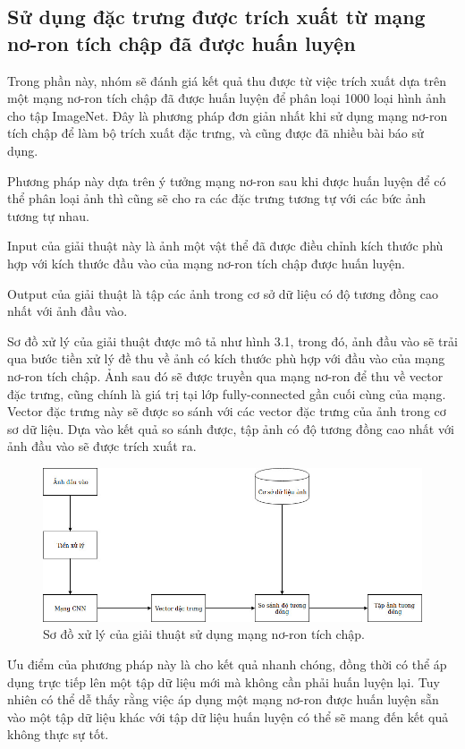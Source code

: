 \documentclass[a4paper,14pt]{extreport}
\begin{document}
\subsection{Sử dụng đặc trưng được trích xuất từ mạng nơ-ron tích chập đã được huấn luyện}
Trong phần này, nhóm sẽ đánh giá kết quả thu được từ việc trích xuất dựa trên một mạng nơ-ron tích 
chập đã được huấn luyện để phân loại 1000 loại hình ảnh cho tập ImageNet. Đây là phương pháp đơn 
giản nhất khi sử dụng mạng nơ-ron tích chập để làm bộ trích xuất đặc trưng, và cũng được đã nhiều bài báo sử dụng.

Phương pháp này dựa trên ý tưởng mạng nơ-ron sau khi được huấn luyện để có thể phân loại ảnh thì cũng sẽ cho 
ra các đặc trưng tương tự với các bức ảnh tương tự nhau.

Input của giải thuật này là ảnh một vật thể đã được điều chỉnh kích thước phù hợp với kích thước đầu vào của mạng nơ-ron tích chập được huấn luyện.

Output của giải thuật là tập các ảnh trong cơ sở dữ liệu có độ tương đồng cao nhất với ảnh đầu vào.

Sơ đồ xử lý của giải thuật được mô tả như hình 3.1, trong đó, ảnh đầu vào sẽ trải qua bước tiền xử lý đề thu về ảnh có kích thước phù hợp với đầu vào của mạng nơ-ron tích chập. Ảnh sau đó sẽ được truyền qua mạng nơ-ron để thu về vector đặc trưng, cũng chính là giá trị tại lớp fully-connected gần cuối cùng của mạng. Vector đặc trưng này sẽ được so sánh với các vector đặc trưng của ảnh trong cơ sơ dữ liệu. Dựa vào kết quả so sánh được, tập ảnh có độ tương đồng cao nhất với ảnh đầu vào sẽ được trích xuất ra.

\begin{figure}  
    \centering
    \includegraphics[scale=0.5]{img/cnn-feature-extractor.jpg}
    \caption{Sơ đồ xử lý của giải thuật sử dụng mạng nơ-ron tích chập.}
\end{figure}    

Ưu điểm của phương pháp này là cho kết quả nhanh chóng, đồng thời có thể áp dụng trực tiếp lên một tập 
dữ liệu mới mà không cần phải huấn luyện lại. Tuy nhiên có thể dễ thấy rằng việc áp dụng một mạng nơ-ron 
được huấn luyện sẵn vào một tập dữ liệu khác với tập dữ liệu huấn luyện có thể sẽ mang đến kết quả không thực sự tốt.
\end{document}
